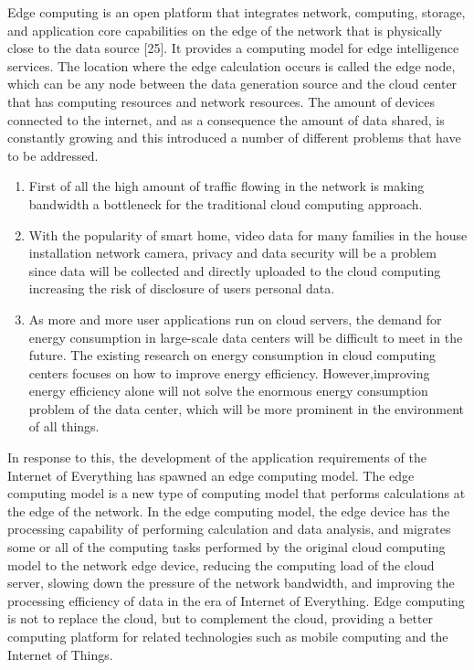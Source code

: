 Edge computing \cite{Edge} is an open platform that integrates network, computing, storage, and application core
capabilities on the edge of the network that is physically close to the data source [25]. It provides
a computing model for edge intelligence services. The location where the edge calculation occurs is 
called the edge node, which can be any node between the data generation source and the cloud center
that has computing resources and network resources. The amount of devices connected to the 
internet, and as a consequence the amount of data shared, is constantly growing and this introduced 
a number of different problems that have to be addressed. 
\\
\begin{enumerate}
    \item First of all the high amount of traffic flowing in the network is making bandwidth a
            bottleneck for the traditional cloud computing approach. 

    \item With the popularity of smart home, video data for many families in the house installation
            network camera, privacy and data security will be a problem since data will be collected
            and directly uploaded to the cloud computing increasing the risk of disclosure of users 
            personal data.

    \item As more and more user applications run on cloud servers, the demand for energy consumption
            in large-scale data centers will be difficult to meet in the future. The existing research on
            energy consumption in cloud computing centers focuses on how to improve energy efficiency.
            However,improving energy efficiency alone will not solve the enormous energy consumption 
            problem of the data center, which will be more prominent in the environment of all things.
\end{enumerate}

In response to this, the development of the application requirements of the Internet of Everything has 
spawned an edge computing model. The edge computing model is a new type of computing model that performs
calculations at the edge of the network. In the edge computing model, the edge device has the processing
capability of performing calculation and data analysis, and migrates some or all of the computing tasks
performed by the original cloud computing model to the network edge device, reducing the computing load
of the cloud server, slowing down the pressure of the network bandwidth, and improving the processing 
efficiency of data in the era of Internet of Everything. Edge computing is not to replace the cloud, 
but to complement the cloud, providing a better computing platform for related technologies such as mobile
computing and the Internet of Things.

